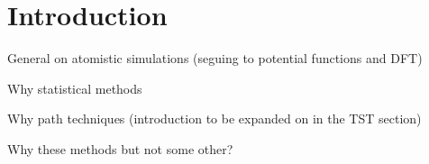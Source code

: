 \section{Introduction}
\label{sec:methods-introduction}

\bit
\item General on atomistic simulations (seguing to potential functions and DFT)
\item Why statistical methods
\item Why path techniques (introduction to be expanded on in the TST section)
\item Why these methods but not some other?
\eit

\placeholder

